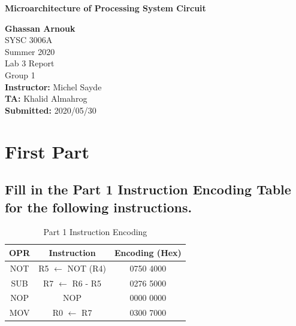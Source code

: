 \documentclass{article}
\begin{document}
	\begin{titlepage}
		\begin{center}
			\vspace{1cm}
			{\LARGE\textbf{Microarchitecture of Processing System Circuit}}

			\vspace{1.5cm}
			\textbf{\large Ghassan Arnouk}\\
			
			\vspace{1cm}
			\large SYSC 3006A\\
			\large Summer 2020\\
			\large Lab 3 Report\\
			\large Group 1\\
			
						
			\vspace{2cm}
			\textbf{Instructor:} Michel Sayde\\
			
			\vspace{0.1cm}
			\textbf{TA:} Khalid Almahrog\\
			
			\vspace{0.1cm}
			\textbf{Submitted:} 2020/05/30\\			
		\end{center}
	\end{titlepage}
	
	\pagebreak
	
	\section{First Part}
	\subsection{Fill in the Part 1 Instruction Encoding Table for the following instructions.}
	\begin{table}[!ht]
		\centering
		\caption{Part 1 Instruction Encoding}
		\vspace{0.2cm}
		\begin{tabular}{|c|c|c|}
			\hline
			OPR & Instruction & Encoding (Hex)\\
			\hline\hline
			NOT & R5 $\leftarrow$ NOT (R4) & 0750 4000\\
			\hline
			SUB & R7 $\leftarrow$ R6 - R5 & 0276 5000\\
			\hline
			NOP & NOP & 0000 0000\\
			\hline
			MOV & R0 $\leftarrow$ R7 & 0300 7000\\
			\hline
		\end{tabular}
	\end{table}
\end{document}
